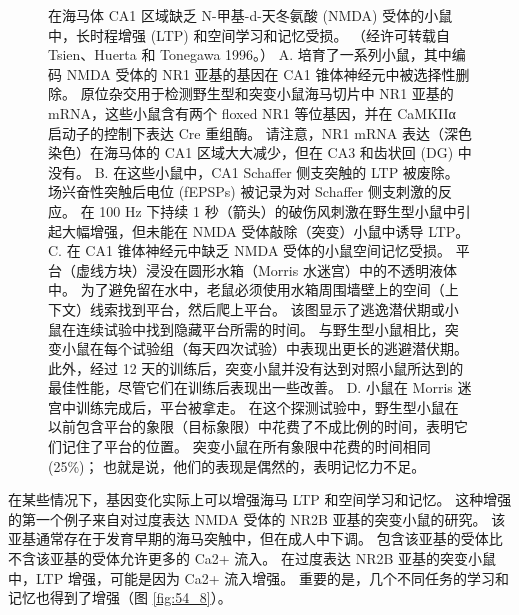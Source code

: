 \begin{figure}[htbp]
	\caption{在海马体 CA1 区域缺乏 N-甲基-d-天冬氨酸 (NMDA) 受体的小鼠中，长时程增强 (LTP) 和空间学习和记忆受损。 （经许可转载自 Tsien、Huerta 和 Tonegawa 1996。） A. 培育了一系列小鼠，其中编码 NMDA 受体的 NR1 亚基的基因在 CA1 锥体神经元中被选择性删除。 原位杂交用于检测野生型和突变小鼠海马切片中 NR1 亚基的 mRNA，这些小鼠含有两个 floxed NR1 等位基因，并在 CaMKIIα 启动子的控制下表达 Cre 重组酶。 请注意，NR1 mRNA 表达（深色染色）在海马体的 CA1 区域大大减少，但在 CA3 和齿状回 (DG) 中没有。 B. 在这些小鼠中，CA1 Schaffer 侧支突触的 LTP 被废除。 场兴奋性突触后电位 (fEPSPs) 被记录为对 Schaffer 侧支刺激的反应。 在 100 Hz 下持续 1 秒（箭头）的破伤风刺激在野生型小鼠中引起大幅增强，但未能在 NMDA 受体敲除（突变）小鼠中诱导 LTP。 C. 在 CA1 锥体神经元中缺乏 NMDA 受体的小鼠空间记忆受损。 平台（虚线方块）浸没在圆形水箱（Morris 水迷宫）中的不透明液体中。 为了避免留在水中，老鼠必须使用水箱周围墙壁上的空间（上下文）线索找到平台，然后爬上平台。 该图显示了逃逸潜伏期或小鼠在连续试验中找到隐藏平台所需的时间。 与野生型小鼠相比，突变小鼠在每个试验组（每天四次试验）中表现出更长的逃避潜伏期。 此外，经过 12 天的训练后，突变小鼠并没有达到对照小鼠所达到的最佳性能，尽管它们在训练后表现出一些改善。 D. 小鼠在 Morris 迷宫中训练完成后，平台被拿走。 在这个探测试验中，野生型小鼠在以前包含平台的象限（目标象限）中花费了不成比例的时间，表明它们记住了平台的位置。 突变小鼠在所有象限中花费的时间相同 (25\%)； 也就是说，他们的表现是偶然的，表明记忆力不足。}
	\label{fig:54_7}
\end{figure}

在某些情况下，基因变化实际上可以增强海马 LTP 和空间学习和记忆。 这种增强的第一个例子来自对过度表达 NMDA 受体的 NR2B 亚基的突变小鼠的研究。 该亚基通常存在于发育早期的海马突触中，但在成人中下调。 包含该亚基的受体比不含该亚基的受体允许更多的 Ca2+ 流入。 在过度表达 NR2B 亚基的突变小鼠中，LTP 增强，可能是因为 Ca2+ 流入增强。 重要的是，几个不同任务的学习和记忆也得到了增强（图 \ref{fig:54_8}）。

